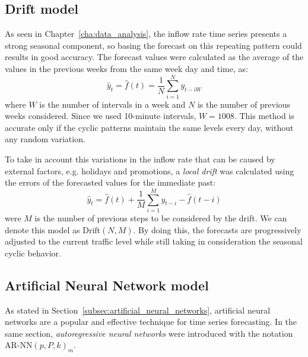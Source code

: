 \subsection{Drift model}
\label{subsec:drift_model}

As seen in Chapter~\ref{cha:data_analysis}, the inflow rate time series presents a strong seasonal component, so basing the forecast on this repeating pattern could results in good accuracy. The forecast values were calculated as the average of the values in the previous weeks from the same week day and time, as:
\begin{equation}
  \hat{y}_t = \hat{f}(t) = \frac{1}{N} \sum_{i=1}^{N} y_{t-iW}
\end{equation}
where \( W \) is the number of intervals in a week and \( N \) is the number of previous weeks considered. Since we used 10-minute intervals, \( W = 1008 \). This method is accurate only if the cyclic patterns maintain the same levels every day, without any random variation.

To take in account this variations in the inflow rate that can be caused by external factors, e.g. holidays and promotions, a \emph{local drift} was calculated using the errors of the forecasted values for the immediate past:
\begin{equation}
  \hat{y}_t = \hat{f}(t) + \frac{1}{M} \sum_{i=1}^{M} y_{t-i} - \hat{f}(t-i)
\end{equation}
were \( M \) is the number of previous steps to be considered by the drift. We can denote this model as \( \text{Drift}(N, M) \). By doing this, the forecasts are progressively adjusted to the current traffic level while still taking in consideration the seasonal cyclic behavior.

\subsection{Artificial Neural Network model}
\label{subsec:artificial_neural_network_model}

As stated in Section~\ref{subsec:artificial_neural_networks}, artificial neural networks are a popular and effective technique for time series forecasting. In the same section, \emph{autoregressive neural networks} were introduced with the notation \( \text{AR-NN}(p, P, k)_m \).

